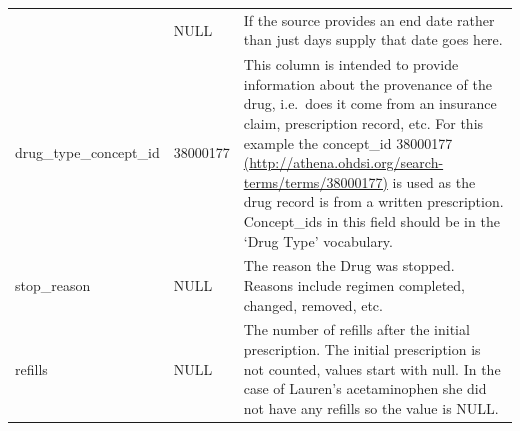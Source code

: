 \documentclass[]{book}
\begin{document}
\begin{longtable}[]{@{}lll@{}}
\begin{minipage}[t]{0.30\columnwidth}
\end{minipage} & \begin{minipage}[t]{0.14\columnwidth}\raggedright
NULL\strut
\end{minipage} & \begin{minipage}[t]{0.48\columnwidth}\raggedright
If the source provides an end date rather than just days supply that date goes here.\strut
\end{minipage}\tabularnewline
\begin{minipage}[t]{0.30\columnwidth}\raggedright
drug\_type\_concept\_id\strut
\end{minipage} & \begin{minipage}[t]{0.14\columnwidth}\raggedright
38000177\strut
\end{minipage} & \begin{minipage}[t]{0.48\columnwidth}\raggedright
This column is intended to provide information about the provenance of the drug, i.e.~does it come from an insurance claim, prescription record, etc. For this example the concept\_id 38000177 \href{http://athena.ohdsi.org/search-terms/terms/38000177}{(http://athena.ohdsi.org/search-terms/terms/38000177)} is used as the drug record is from a written prescription. Concept\_ids in this field should be in the `Drug Type' vocabulary.\strut
\end{minipage}\tabularnewline
\begin{minipage}[t]{0.30\columnwidth}\raggedright
stop\_reason\strut
\end{minipage} & \begin{minipage}[t]{0.14\columnwidth}\raggedright
NULL\strut
\end{minipage} & \begin{minipage}[t]{0.48\columnwidth}\raggedright
The reason the Drug was stopped. Reasons include regimen completed, changed, removed, etc.\strut
\end{minipage}\tabularnewline
\begin{minipage}[t]{0.30\columnwidth}\raggedright
refills\strut
\end{minipage} & \begin{minipage}[t]{0.14\columnwidth}\raggedright
NULL\strut
\end{minipage} & \begin{minipage}[t]{0.48\columnwidth}\raggedright
The number of refills after the initial prescription. The initial prescription is not counted, values start with null. In the case of Lauren's acetaminophen she did not have any refills so the value is NULL.\strut

\end{minipage}
\end{longtable}
\end{document}

